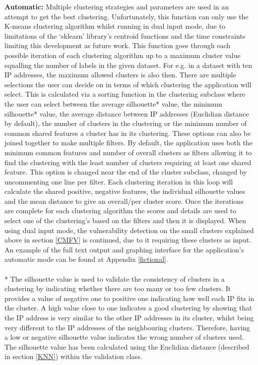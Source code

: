     \textbf{Automatic:}
     Multiple clustering strategies and parameters are used in an attempt to get the best clustering. Unfortunately, this function can only use the K-means clustering algorithm whilst running in dual input mode, due to limitations of the ‘sklearn' library's centroid functions and the time constraints limiting this development as future work. This function goes through each possible iteration of each clustering algorithm up to a maximum cluster value equalling the number of labels in the given dataset. For e.g. in a dataset with ten IP addresses, the maximum allowed clusters is also then. There are multiple selections the user can decide on in terms of which clustering the application will select. This is calculated via a sorting function in the clustering subclass where the user can select between the average silhouette* value, the minimum silhouette* value, the average distance between IP addresses (Euclidian distance by default), the number of clusters in the clustering or the minimum number of common shared features a cluster has in its clustering. These options can also be joined together to make multiple filters. By default, the application uses both the minimum common features and number of overall clusters as filters allowing it to find the clustering with the least number of clusters requiring at least one shared feature. This option is changed near the end of the cluster subclass, changed by uncommenting one line per filter. Each clustering iteration in this loop will calculate the shared positive, negative features, the individual silhouette values and the mean distance to give an overall/per cluster score. Once the iterations are complete for each clustering algorithm the scores and details are used to select one of the clustering's based on the filters and then it is displayed. When using dual input mode, the vulnerability detection on the small clusters explained above in section \ref{CMFV} is continued, due to it requiring these clusters as input. An example of the full text output and graphing interface for the application's automatic mode can be found at Appendix \ref{fictional}.\linebreak
\paragraph{}* The silhouette value is used to validate the consistency of clusters in a clustering by indicating whether there are too many or too few clusters. It provides a value of negative one to positive one indicating how well each IP fits in the cluster.  A high value close to one indicates a good clustering by showing that the IP address is very similar to the other IP addresses in its cluster, whilst being very different to the IP addresses of the neighbouring clusters. Therefore, having a low or negative silhouette value indicates the wrong number of clusters used. The silhouette value has been calculated using the Euclidian distance (described in section \ref{KNN}) within the validation class.
     
